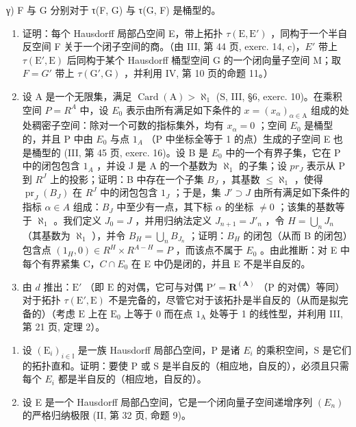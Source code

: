 γ) F 与 G 分别对于 τ(F, G) 与 τ(G, F) 是桶型的。

\begin{enumerate}
\def\labelenumi{\alph{enumi})}
\setcounter{enumi}{2}
\item
  证明：每个 Hausdorff 局部凸空间 E，带上拓扑 \(\tau(\mathrm{E}, \mathrm{E}')\) ，同构于一个半自反空间 F 关于一个闭子空间的商。（由 III, 第 44 页, exerc. 14, c)，\(E'\) 带上 \(\tau(\mathrm{E}', \mathrm{E})\) 后同构于某个 Hausdorff 桶型空间 G 的一个闭向量子空间 M；取 \(F = G'\) 带上 \(\tau(\mathrm{G}', \mathrm{G})\) ，并利用 IV, 第 10 页的命题 11。）
\item
  设 A 是一个无限集，满足 \(\operatorname{Card}(\mathrm{A}) > \aleph_{1}\) (S, III, §6, exerc. 10)。在乘积空间 \(P = R^{A}\) 中，设 \(E_{0}\) 表示由所有满足如下条件的 \(x = (x_{\alpha})_{\alpha \in \mathrm{A}}\) 组成的处处稠密子空间：除对一个可数的指标集外，均有 \(x_{\alpha} = 0\) ；空间 \(E_{0}\) 是桶型的，并且 P 中由 \(E_{0}\) 与点 \(1_{A}\) （P 中坐标全等于 1 的点）生成的子空间 E 也是桶型的 (III, 第 45 页, exerc. 16)。设 B 是 \(E_{0}\) 中的一个有界子集，它在 P 中的闭包包含 \(1_{A}\) ，并设 J 是 A 的一个基数为 \(\aleph_{1}\) 的子集；设 \(pr_{J}\) 表示从 P 到 \(R^{J}\) 上的投影；证明：B 中存在一个子集 \(B_{J}\) ，其基数 \(\leqslant \aleph_{1}\) ，使得 \(\operatorname{pr}_{J}(B_{J})\) 在 \(R^{J}\) 中的闭包包含 \(1_{J}\) ；于是，集 \(J' \supset J\) 由所有满足如下条件的指标 \(\alpha \in A\) 组成：\(B_{J}\) 中至少有一点，其下标 \(\alpha\) 的坐标 \(\neq 0\) ；该集的基数等于 \(\aleph_{1}\) 。我们定义 \(J_{0} = J\) ，并用归纳法定义 \(J_{n+1} = J'_{n}\) ，令 \(H = \bigcup_{n} J_{n}\) （其基数为 \(\aleph_{1}\) ），并令 \(B_{H} = \bigcup_{n} B_{J_{n}}\) ；证明：\(B_{H}\) 的闭包（从而 B 的闭包）包含点 \((1_{H}, 0) \in R^{H} \times R^{A-H} = P\) ，而该点不属于 \(E_{0}\) 。由此推断：对 E 中每个有界紧集 C，\(C \cap E_{0}\) 在 E 中仍是闭的，并且 E 不是半自反的。
\item
  由 \(d\) 推出：\(\mathrm{E}'\) （即 \(\mathrm{E}\) 的对偶，它可与对偶 \(\mathrm{P}' = \mathbf{R}^{(\mathbf{A})}\) （\(\mathrm{P}\) 的对偶）等同）对于拓扑 \(\tau (\mathrm{E}',\mathrm{E})\) 不是完备的，尽管它对于该拓扑是半自反的（从而是拟完备的）（考虑 \(\mathrm{E}\) 上在 \(\mathrm{E}_0\) 上等于 0 而在点 \(1_{\mathrm{A}}\) 处等于 1 的线性型，并利用 III, 第 21 页, 定理 2）。
\end{enumerate}

\begin{enumerate}
\def\labelenumi{\arabic{enumi})}
\setcounter{enumi}{6}
\item
  设 \((\mathrm{E}_{i})_{i\in\mathbb{I}}\) 是一族 Hausdorff 局部凸空间，P 是诸 \(E_{i}\) 的乘积空间，S 是它们的拓扑直和。证明：要使 P 或 S 是半自反的（相应地，自反的），必须且只需每个 \(E_{i}\) 都是半自反的（相应地，自反的）。
\item
  设 E 是一个 Hausdorff 局部凸空间，它是一个闭向量子空间递增序列 \((E_{n})\) 的严格归纳极限 (II, 第 32 页, 命题 9)。
\end{enumerate}

